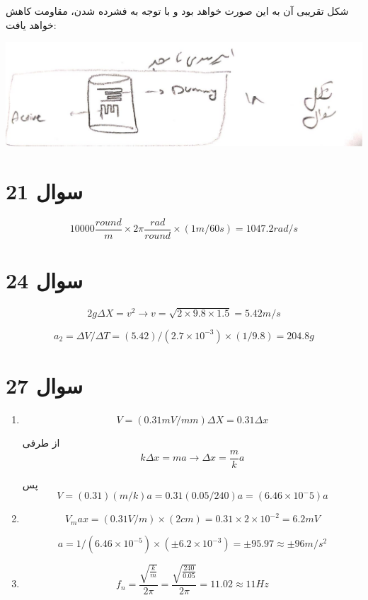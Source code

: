 \documentclass[12pt]{article}
\begin{document}
شکل تقریبی آن به این صورت خواهد بود  و با توجه به فشرده شدن، مقاومت کاهش خواهد یافت:

\begin{center}
	\includegraphics[width = 1.0 \textwidth]{images/6.png}
\end{center}


\newpage

\section*{سوال 21}

$$10000 \frac{round}{m} \times 2 \pi\frac{rad}{round} \times (1 m/ 60 s) = 1047.2 rad/s$$


\section*{سوال 24}

$$2 g \Delta X = v^2 \rightarrow v = \sqrt{2 \times 9.8 \times 1.5} = 5.42 m/s$$

$$a_2 = \Delta V / \Delta T = (5.42) / (2.7 \times 10^{-3}) \times (1/9.8) = 204.8 g$$

\section*{سوال 27}

\begin{enumerate}
	\item
	
	$$V = (0.31 mV/mm) \Delta X = 0.31 \Delta x$$
	
	از طرفی
	$$k \Delta x = m a \rightarrow \Delta x = \frac{m}{k}a$$
	
	پس
	$$V = (0.31) (m/k) a = 0.31 (0.05 /240) a = (6.46 \times 10^-5) a$$
	
	\item
	
	$$V_max = (0.31 V/m) \times (2 cm) = 0.31 \times 2 \times 10^{-2} = 6.2 mV $$
	
	$$a = 1/(6.46 \times 10^{-5}) \times (\pm 6.2 \times 10^{-3}) = \pm 95.97 \approx \pm 96 m/s^2$$
	
	\item
	
	$$f_n = \frac{\sqrt{\frac{k}{m}}}{2 \pi } = \frac{\sqrt{\frac{240}{0.05}}}{2 \pi } = 11.02 \approx 11 Hz$$
\end{enumerate}
\end{document}
